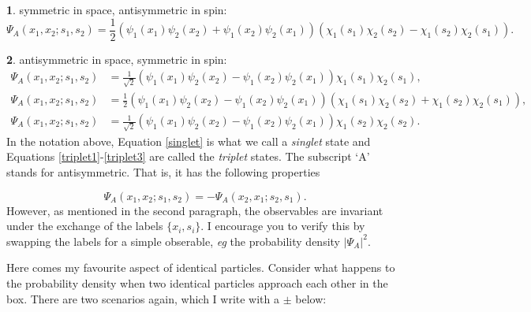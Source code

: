 \documentclass{article}
\numberwithin{equation}{section} %
\begin{document}
\noindent\textbf{1}. symmetric in space, antisymmetric in spin:
\begin{equation}
\Psi_A(x_1,x_2;s_1,s_2)=\frac{1}{2}\left(\psi_1(x_1)\psi_2(x_2) + \psi_1(x_2)\psi_2(x_1) \right) \left( \chi_1(s_1)\chi_2(s_2) - \chi_1(s_2)\chi_2(s_1) \right).
\label{singlet}
\end{equation}

\noindent\textbf{2}. antisymmetric in space, symmetric in spin:
\begin{align}
\Psi_A(x_1,x_2;s_1,s_2) &=\frac{1}{\sqrt{2}}\left(\psi_1(x_1)\psi_2(x_2) - \psi_1(x_2)\psi_2(x_1) \right) \chi_1(s_1)\chi_2(s_1),\label{triplet1}\\
\Psi_A(x_1,x_2;s_1,s_2) &=\frac{1}{2}\left(\psi_1(x_1)\psi_2(x_2) - \psi_1(x_2)\psi_2(x_1) \right) \left( \chi_1(s_1)\chi_2(s_2) + \chi_1(s_2)\chi_2(s_1) \right),\label{triplet2}\\
\Psi_A(x_1,x_2;s_1,s_2) &=\frac{1}{\sqrt{2}}\left(\psi_1(x_1)\psi_2(x_2) - \psi_1(x_2)\psi_2(x_1) \right) \chi_1(s_2)\chi_2(s_2)\label{triplet3}.
\end{align}
In the notation above, Equation \ref{singlet} is what we call a \textit{singlet} state and Equations \ref{triplet1}-\ref{triplet3} are called the \textit{triplet} states. The subscript `A' stands for antisymmetric. That is, it has the following properties

\begin{equation}
\Psi_A(x_1,x_2;s_1,s_2) = - \Psi_A(x_2,x_1;s_2,s_1).
\end{equation}
However, as mentioned in the second paragraph, the observables are invariant under the exchange of the labels $\{x_i,s_i\}$. I encourage you to verify this by swapping the labels for a simple obserable, \textit{eg} the probability density $\vert \Psi_A\vert^2$.

Here comes my favourite aspect of identical particles.  Consider what happens to the probability density when two identical particles approach each other in the box. There are two scenarios again, which I write with a $\pm$ below:
\end{document}
